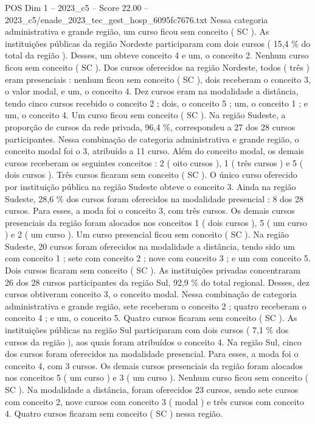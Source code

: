 \begin{textsample}{POS Dim 1 – 2023\_c5 – Score 22.00 – 2023\_c5/enade\_2023\_tec\_gest\_hosp\_6095fc7676.txt}
Nessa categoria administrativa e grande região, um curso ficou sem conceito ( SC ).
As instituições públicas da região Nordeste participaram com dois cursos ( 15,4 \% do total da região ).
Desses, um obteve conceito 4 e um, o conceito 2.
Nenhum curso ficou sem conceito ( SC ).
Dos cursos oferecidos na região Nordeste, todos ( três ) eram presenciais : nenhum ficou sem conceito ( SC ), dois receberam o conceito 3, o valor modal, e um, o conceito 4.
Dez cursos eram na modalidade a distância, tendo cinco cursos recebido o conceito 2 ; dois, o conceito 5 ; um, o conceito 1 ; e um, o conceito 4.
Um curso ficou sem conceito ( SC ).
Na região Sudeste, a proporção de cursos da rede privada, 96,4 \%, correspondeu a 27 dos 28 cursos participantes.
Nessa combinação de categoria administrativa e grande região, o conceito modal foi o 3, atribuído a 11 curso.
Além do conceito modal, os demais cursos receberam os seguintes conceitos : 2 ( oito cursos ), 1 ( três cursos ) e 5 ( dois cursos ).
Três cursos ficaram sem conceito ( SC ).
O único curso oferecido por instituição pública na região Sudeste obteve o conceito 3.
Ainda na região Sudeste, 28,6 \% dos cursos foram oferecidos na modalidade presencial : 8 dos 28 cursos.
Para esses, a moda foi o conceito 3, com três cursos.
Os demais cursos presenciais da região foram alocados nos conceitos 1 ( dois cursos ), 5 ( um curso ) e 2 ( um curso ).
Um curso presencial ficou sem conceito ( SC ).
Na região Sudeste, 20 cursos foram oferecidos na modalidade a distância, tendo sido um com conceito 1 ; sete com conceito 2 ; nove com conceito 3 ; e um com conceito 5.
Dois cursos ficaram sem conceito ( SC ).
As instituições privadas concentraram 26 dos 28 cursos participantes da região Sul, 92,9 \% do total regional.
Desses, dez cursos obtiveram conceito 3, o conceito modal.
Nessa combinação de categoria administrativa e grande região, sete receberam o conceito 2 ; quatro receberam o conceito 4 ; e um, o conceito 5.
Quatro cursos ficaram sem conceito ( SC ).
As instituições públicas na região Sul participaram com dois cursos ( 7,1 \% dos cursos da região ), aos quais foram atribuídos o conceito 4.
Na região Sul, cinco dos cursos foram oferecidos na modalidade presencial.
Para esses, a moda foi o conceito 4, com 3 cursos.
Os demais cursos presenciais da região foram alocados nos conceitos 5 ( um curso ) e 3 ( um curso ).
Nenhum curso ficou sem conceito ( SC ).
Na modalidade a distância, foram oferecidos 23 cursos, sendo sete cursos com conceito 2, nove cursos com conceito 3 ( modal ) e três cursos com conceito 4.
Quatro cursos ficaram sem conceito ( SC ) nessa região.

\end{textsample}
